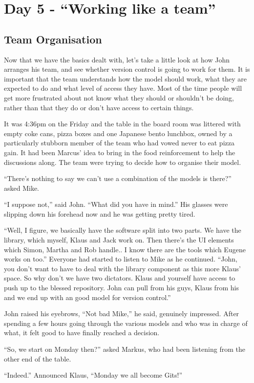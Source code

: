 \section{Day 5 - ``Working like a team''}

\subsection{Team Organisation}

Now that we have the basics dealt with, let's take a little look at how John arranges his team, and see whether version control is going to work for them.  It is important that the team understands how the model should work, what they are expected to do and what level of access they have.  Most of the time people will get more frustrated about not know what they should or shouldn't be doing, rather than that they do or don't have access to certain things.

\begin{trenches}
It was 4:36pm on the Friday and the table in the board room was littered with empty coke cans, pizza boxes and one Japanese bento lunchbox, owned by a particularly stubborn member of the team who had vowed never to eat pizza gain.  It had been Marcus' idea to bring in the food reinforcement to help the discussions along.  The team were trying to decide how to organise their model.

``There's nothing to say we can't use a combination of the models is there?'' asked Mike.

``I suppose not,'' said John.  ``What did you have in mind.''  His glasses were slipping down his forehead now and he was getting pretty tired.

``Well, I figure, we basically have the software split into two parts.  We have the library, which myself, Klaus and Jack work on.  Then there's the UI elements which Simon, Martha and Rob handle..  I know there are the tools which Eugene works on too.''  Everyone had started to listen to Mike as he continued.  ``John, you don't want to have to deal with the library component as this more Klaus' space.  So why don't we have two dictators.  Klaus and yourself have access to push up to the blessed repository.  John can pull from his guys, Klaus from his and we end up with an good model for version control.''

John raised his eyebrows, ``Not bad Mike,'' he said, genuinely impressed.  After spending a few hours going through the various models and who was  in charge of what, it felt good to have finally reached a decision.

``So, we start on Monday then?'' asked Markus, who had been listening from the other end of the table.  

``Indeed.''  Announced Klaus, ``Monday we all become Gits!''
\end{trenches}
